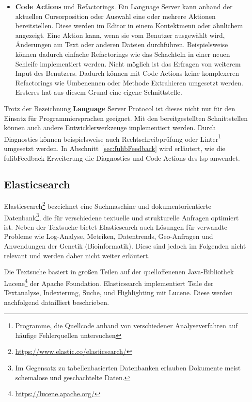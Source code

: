 \begin{itemize}
    \item \textbf{Code Actions} und Refactorings.
    Ein Language Server kann anhand der aktuellen Cursorposition oder Auswahl eine oder mehrere Aktionen bereitstellen.
    Diese werden im Editor in einem Kontektmenü oder ähnlichem angezeigt.
    Eine Aktion kann, wenn sie vom Benutzer ausgewählt wird, Änderungen am Text oder anderen Dateien durchführen.
    Beispielsweise können dadurch einfache Refactorings wie das Schachteln in einer neuen Schleife implementiert werden.
    Nicht möglich ist das Erfragen von weiterem Input des Benutzers.
    Dadurch können mit Code Actions keine komplexeren Refactorings wie Umbenennen oder Methode Extrahieren umgesetzt werden.
    Ersteres hat aus diesem Grund eine eigene Schnittstelle.
\end{itemize}

Trotz der Bezeichnung \textbf{Language} Server Protocol ist dieses nicht nur für den Einsatz für Programmiersprachen geeignet.
Mit den bereitgestellten Schnittstellen können auch andere Entwicklerwerkzeuge implementiert werden.
Durch Diagnostics können beispielsweise auch Rechtschreibprüfung oder Linter\footnote{Programme, die Quellcode anhand von verschiedener Analyseverfahren auf häufige Fehlerquellen untersuchen} umgesetzt werden.
In Abschnitt~\ref{sec:fulibFeedback} wird erläutert, wie die fulibFeedback-Erweiterung die Diagnostics und Code Actions des \ac{lsp} anwendet.

\subsection{Elasticsearch}\label{subsec:elasticsearch}

Elasticsearch\footnote{\url{https://www.elastic.co/elasticsearch/}} bezeichnet eine Suchmaschine und dokumentorientierte Datenbank\footnote{Im Gegensatz zu tabellenbasierten Datenbanken erlauben Dokumente meist schemalose und geschachtelte Daten.}, die für verschiedene textuelle und strukturelle Anfragen optimiert ist.
Neben der Textsuche bietet Elasticsearch auch Lösungen für verwandte Probleme wie Log-Analyse, Metriken, Datentrends, Geo-Anfragen und Anwendungen der Genetik (Bioinformatik).
Diese sind jedoch im Folgenden nicht relevant und werden daher nicht weiter erläutert.

Die Textsuche basiert in großen Teilen auf der quelloffenenen Java-Bibliothek Lucene\footnote{\url{https://lucene.apache.org/}} der Apache Foundation.
Elasticsearch implementiert Teile der Textanalyse, Indexierung, Suche, und Highlighting mit Lucene.
Diese werden nachfolgend datailliert beschrieben.

